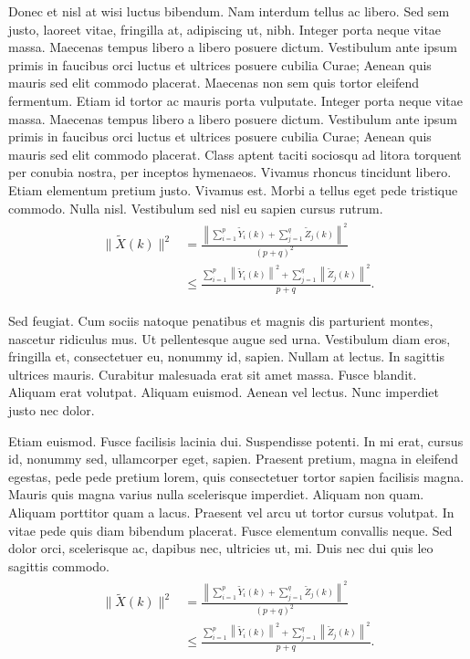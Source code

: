 \documentclass[ASNA,twocolumn]{USG} %
\begin{document}
{Donec et nisl at wisi luctus bibendum. Nam interdum tellus ac libero. Sed sem justo, laoreet vitae, fringilla at,
adipiscing ut, nibh. Integer porta neque vitae massa. Maecenas tempus libero a libero posuere dictum. Vestibulum ante ipsum primis in
faucibus orci luctus et ultrices posuere cubilia Curae; Aenean quis mauris sed elit commodo placerat.
Maecenas non sem quis tortor eleifend fermentum. Etiam id tortor ac mauris porta vulputate.
Integer porta neque vitae massa. Maecenas tempus libero a libero posuere dictum. Vestibulum ante ipsum primis in
faucibus orci luctus et ultrices posuere cubilia Curae; Aenean quis mauris sed elit commodo placerat. Class aptent
taciti sociosqu ad litora torquent per conubia nostra, per inceptos hymenaeos. Vivamus rhoncus tincidunt libero.
Etiam elementum pretium justo. Vivamus est. Morbi a tellus eget pede tristique commodo. Nulla nisl. Vestibulum
sed nisl eu sapien cursus rutrum.
\begin{align}\label{eq23}
\begin{split}
 \|\tilde{X}(k)\|^2
 &=\frac{\left\|\sum\limits_{i=1}^{p}\tilde{Y}_i(k)+\sum\limits_{j=1}^{q}\tilde{Z}_j(k) \right\|^2}{(p+q)^2} \\
& \leq\frac{\sum\limits_{i=1}^{p}\left\|\tilde{Y}_i(k)\right\|^2+\sum\limits_{j=1}^{q}\left\|\tilde{Z}_j(k)\right\|^2 }{p+q}.
\end{split}
\end{align}

Sed feugiat. Cum sociis natoque penatibus et magnis dis parturient montes, nascetur ridiculus mus. Ut pellentesque
augue sed urna. Vestibulum diam eros, fringilla et, consectetuer eu, nonummy id, sapien. Nullam at lectus. In sagittis
ultrices mauris. Curabitur malesuada erat sit amet massa. Fusce blandit. Aliquam erat volutpat. Aliquam euismod.
Aenean vel lectus. Nunc imperdiet justo nec dolor.

Etiam euismod. Fusce facilisis lacinia dui. Suspendisse potenti. In mi erat, cursus id, nonummy sed, ullamcorper
eget, sapien. Praesent pretium, magna in eleifend egestas, pede pede pretium lorem, quis consectetuer tortor sapien
facilisis magna. Mauris quis magna varius nulla scelerisque imperdiet. Aliquam non quam. Aliquam porttitor quam
a lacus. Praesent vel arcu ut tortor cursus volutpat. In vitae pede quis diam bibendum placerat. Fusce elementum
convallis neque. Sed dolor orci, scelerisque ac, dapibus nec, ultricies ut, mi. Duis nec dui quis leo sagittis commodo.
\begin{align}\label{eq24}
\begin{split}
 \|\tilde{X}(k)\|^2
 &=\frac{\left\|\sum\limits_{i=1}^{p}\tilde{Y}_i(k)+\sum\limits_{j=1}^{q}\tilde{Z}_j(k) \right\|^2}{(p+q)^2} \\
& \leq\frac{\sum\limits_{i=1}^{p}\left\|\tilde{Y}_i(k)\right\|^2+\sum\limits_{j=1}^{q}\left\|\tilde{Z}_j(k)\right\|^2 }{p+q}.
\end{split}
\end{align}

}
\end{document}
